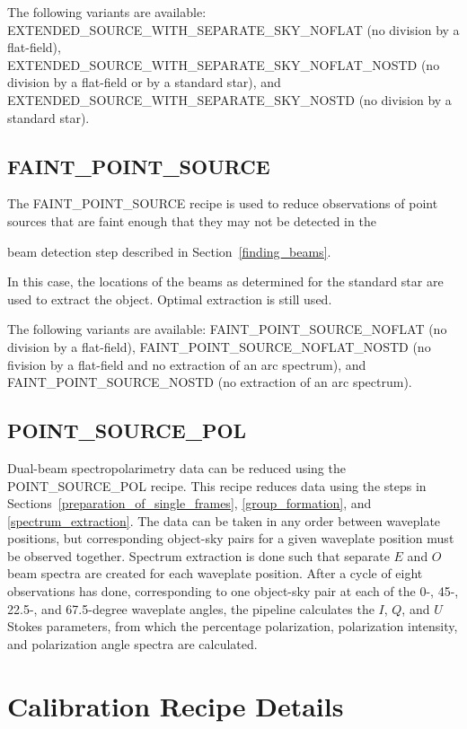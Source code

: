 \documentclass[twoside,11pt,nolof]{starlink}
\begin{document}
The following variants are available: EXTENDED\_SOURCE\_WITH\_SEPARATE\_SKY\_NOFLAT (no division by a flat-field), EXTENDED\_SOURCE\_WITH\_SEPARATE\_SKY\_NOFLAT\_NOSTD (no division by a flat-field or by a standard star), and EXTENDED\_SOURCE\_WITH\_SEPARATE\_SKY\_NOSTD (no division by a standard star).

\subsection{FAINT\_POINT\_SOURCE\label{faint_point_source}}

The FAINT\_POINT\_SOURCE recipe is used to reduce observations of point sources that are faint enough that they may not be detected in the
\begin{latexonly}
beam detection step described in Section~\ref{finding_beams}.
\end{latexonly}
In this case, the locations of the beams as determined for the standard star are used to extract the object. Optimal extraction is still used.

The following variants are available: FAINT\_POINT\_SOURCE\_NOFLAT (no division by a flat-field), FAINT\_POINT\_SOURCE\_NOFLAT\_NOSTD (no fivision by a flat-field and no extraction of an arc spectrum), and FAINT\_POINT\_SOURCE\_NOSTD (no extraction of an arc spectrum).

\subsection{POINT\_SOURCE\_POL\label{point_source_pol}}

Dual-beam spectropolarimetry data can be reduced using the POINT\_SOURCE\_POL recipe. This recipe reduces data using the steps in Sections~\ref{preparation_of_single_frames}, \ref{group_formation}, and \ref{spectrum_extraction}. The data can be taken in any order between waveplate positions, but corresponding object-sky pairs for a given waveplate position must be observed together. Spectrum extraction is done such that separate $E$ and $O$ beam spectra are created for each waveplate position. After a cycle of eight observations has done, corresponding to one object-sky pair at each of the 0-, 45-, 22.5-, and 67.5-degree waveplate angles, the pipeline calculates the $I$, $Q$, and $U$ Stokes parameters, from which the percentage polarization, polarization intensity, and polarization angle spectra are calculated.

\section{Calibration Recipe Details\label{calibration_recipe_details}}
\end{document}
